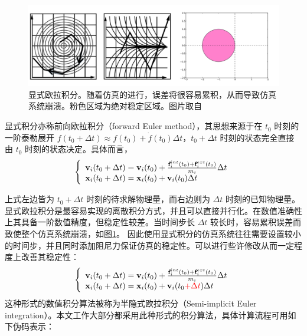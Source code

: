 \begin{figure}[!htb]
  \centering
  \captionsetup{justification=centering}
  \includegraphics[width=\linewidth]{chap/image/explicit_method}

  \caption{\label{explicit_method}
           显式欧拉积分。随着仿真的进行，误差将很容易累积，从而导致仿真系统崩溃。粉色区域为绝对稳定区域。图片取自
          }
\end{figure}

显式积分亦称前向欧拉积分（forward Euler method），其思想来源于在 $t_0$ 时刻的一阶泰勒展开 $f(t_0 + \Delta t) \approx f(t_0) + \dot{f}(t_0)\Delta t$，$t_0 + \Delta t$ 时刻的状态完全直接由 $t_0$ 时刻的状态决定。具体而言，
\begin{equation}
\left\{ \begin{array}{l}
\textbf{v}_i(t_0+\Delta t) = \textbf{v}_i(t_0)+\frac{\textbf{f}_i^{int}(t_0) + \textbf{f}_i^{ext}(t_0)}{m_i}\Delta t\\
\textbf{x}_i(t_0+\Delta t) = \textbf{x}_i(t_0)+\textbf{v}_i(t_0)\Delta t
\end{array} \right.
\end{equation}

上式左边皆为 $t_0 + \Delta t$ 时刻的待求解物理量，而右边则为 $\Delta t$ 时刻的已知物理量。显式欧拉积分是最容易实现的离散积分方式，并且可以直接并行化。在数值准确性上其具备一阶数值精度，但稳定性较差。当时间步长 $\Delta t$ 较长时，容易累积误差而致使整个仿真系统崩溃，如图\ref{explicit_method}。 因此使用显式积分的仿真系统往往需要设置较小的时间步，并且同时添加阻尼力保证仿真的稳定性。可以进行些许修改从而一定程度上改善其稳定性：
\begin{equation}
\left\{ \begin{array}{l}
\textbf{v}_i(t_0+\Delta t) = \textbf{v}_i(t_0)+\frac{\textbf{f}_i^{int}(t_0) + \textbf{f}_i^{ext}(t_0)}{m_i}\Delta t\\
\textbf{x}_i(t_0+\Delta t) = \textbf{x}_i(t_0)+\textbf{v}_i(t_0 \textcolor{red}{ + \Delta t})\Delta t
\end{array} \right.
\end{equation}
这种形式的数值积分算法被称为半隐式欧拉积分（Semi-implicit Euler integration）。本文工作大部分都采用此种形式的积分算法，具体计算流程可用如下伪码表示：\\

